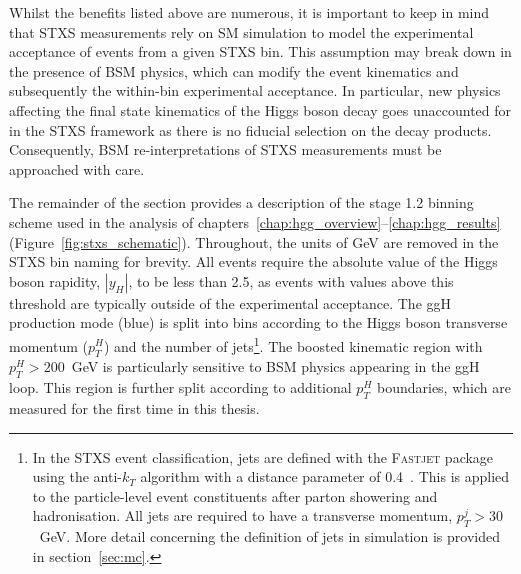 Whilst the benefits listed above are numerous, it is important to keep in mind that STXS measurements rely on SM simulation to model the experimental acceptance of events from a given STXS bin. This assumption may break down in the presence of BSM physics, which can modify the event kinematics and subsequently the within-bin experimental acceptance. In particular, new physics affecting the final state kinematics of the Higgs boson decay goes unaccounted for in the STXS framework as there is no fiducial selection on the decay products. Consequently, BSM re-interpretations of STXS measurements must be approached with care.

The remainder of the section provides a description of the stage 1.2 binning scheme used in the \Hgg analysis of chapters~\ref{chap:hgg_overview}--\ref{chap:hgg_results} (Figure~\ref{fig:stxs_schematic}). Throughout, the units of GeV are removed in the STXS bin naming for brevity. All events require the absolute value of the Higgs boson rapidity, $|y_H|$, to be less than 2.5, as events with values above this threshold are typically outside of the experimental acceptance. The ggH production mode (blue) is split into bins according to the Higgs boson transverse momentum ($p_T^H$) and the number of jets\footnote{In the STXS event classification, jets are defined with the \textsc{Fastjet} package~\cite{Cacciari:2011ma} using the anti-$k_T$ algorithm with a distance parameter of 0.4~\cite{Cacciari:2008gp}. This is applied to the particle-level event constituents after parton showering and hadronisation. All jets are required to have a transverse momentum, $p_T^j>30$~GeV. More detail concerning the definition of jets in simulation is provided in section~\ref{sec:mc}.}. The boosted kinematic region with ${p_T^H>200}$~GeV is particularly sensitive to BSM physics appearing in the ggH loop. This region is further split according to additional $p_T^H$ boundaries, which are measured for the first time in this thesis. 

